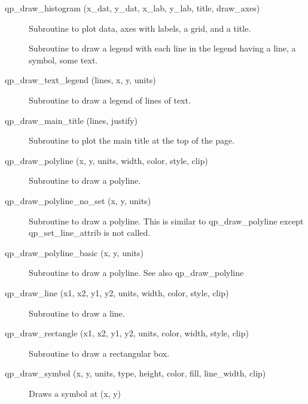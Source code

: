 \begin{description}
\item[qp_draw_histogram (x_dat, y_dat, x_lab, y_lab, title, draw_axes)] \Newline 
     Subroutine to plot data, axes with labels, a grid, and a title.

\item[\protect\parbox{6in}{qp_draw_curve_legend (origin, text_offset, line_length, \\ 
\hspace*{2in}  line, symbol, text, draw_line, draw_symbol, draw_text) }] \Newline
Subroutine to draw a legend with each line in the legend having
  a line, a symbol, some text.

\item[qp_draw_text_legend (lines, x, y, units)] \Newline 
Subroutine to draw a legend of lines of text.

\item[qp_draw_main_title (lines, justify)] \Newline 
     Subroutine to plot the main title at the top of the page.

\item[qp_draw_polyline (x, y, units, width, color, style, clip)] \Newline 
     Subroutine to draw a polyline.

\item[qp_draw_polyline_no_set (x, y, units)] \Newline 
Subroutine to draw a polyline.
This is similar to qp_draw_polyline except qp_set_line_attrib is not called.

\item[qp_draw_polyline_basic (x, y, units) ] \Newline 
     Subroutine to draw a polyline. See also qp_draw_polyline

\item[qp_draw_line (x1, x2, y1, y2, units, width, color, style, clip)] \Newline 
     Subroutine to draw a line.

\item[qp_draw_rectangle (x1, x2, y1, y2, units, color, width, style, clip) ] \Newline 
     Subroutine to draw a rectangular box.

\item[qp_draw_symbol (x, y, units, type, height, color, fill, line_width, clip)] \Newline 
     Draws a symbol at (x, y) 


\end{description}

